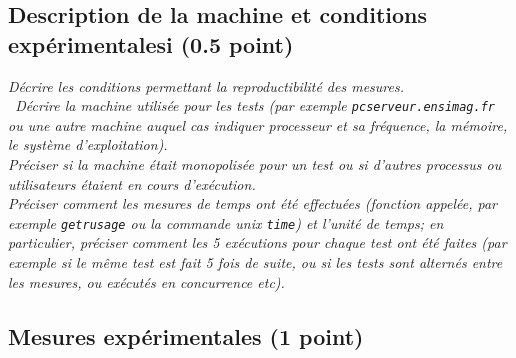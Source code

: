 \documentclass[a4paper,10pt,french]{article}
\begin{document}
  \subsection{Description de la machine et conditions expérimentalesi (0.5 point) }
     {\em  Décrire les conditions permettant la reproductibilité des mesures. 
      \\ Décrire la machine utilisée pour les tests (par exemple {\tt pcserveur.ensimag.fr} ou une autre machine auquel cas indiquer processeur et sa fréquence, la mémoire, le système d'exploitation). \\
      Préciser si la machine était monopolisée pour un test ou si 
       d'autres processus ou utilisateurs étaient en cours d'exécution.\\
       Préciser comment les mesures de temps ont été effectuées (fonction appelée, par exemple {\tt getrusage} ou la commande unix {\tt time}) et l'unité de temps; en particulier, 
       préciser comment les 5 exécutions pour chaque test ont été faites (par exemple si le même test est fait 5 fois de suite, ou si les tests sont alternés entre
       les mesures, ou exécutés en concurrence etc). 
       
     }

  \subsection{Mesures expérimentales (1 point)}
\end{document}
